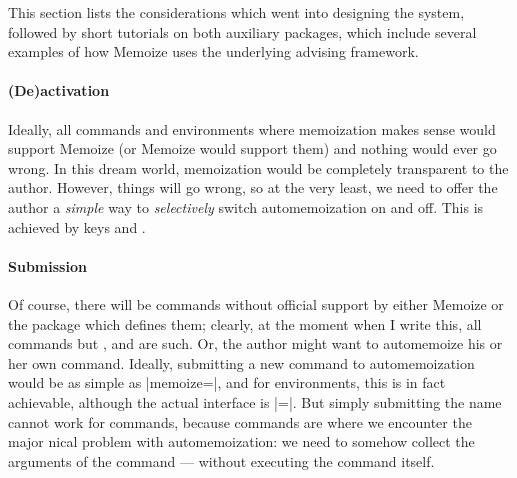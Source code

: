 \documentclass[a4paper,11pt]{article}
\begin{document}
This section lists the considerations which went into designing the system,
followed by short tutorials on both auxiliary packages, which include several
examples of how Memoize uses the underlying advising framework.

\paragraph{(De)activation}
Ideally, all commands and environments where memoization makes sense would
support Memoize (or Memoize would support them) and nothing would ever go
wrong.  In this dream world, memoization would be completely transparent to the
author.  However, things will go wrong, so at the very least, we need to
offer the author a \emph{simple} way to \emph{selectively} switch automemoization
on and off.  This is achieved by keys  and
.

\paragraph{Submission}
Of course, there will be commands without official support by either Memoize or
the package which defines them; clearly, at the moment when I write this, all
commands but ,  and  are such.  Or, the
author might want to automemoize his or her own command.  Ideally, submitting a
new command to automemoization would be as simple as
|memoize=|{}, and for environments, this is in fact achievable,
although the actual interface is
|=|.  But
simply submitting the name cannot work for commands, because commands are where
we encounter the major nical problem with automemoization: we need
to somehow collect the arguments of the command --- without executing the
command itself.
\end{document}
